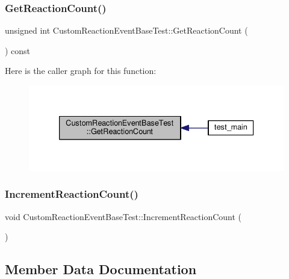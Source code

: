 \subsubsection{\texorpdfstring{Get\+Reaction\+Count()}{GetReactionCount()}}
{\footnotesize\ttfamily unsigned int Custom\+Reaction\+Event\+Base\+Test\+::\+Get\+Reaction\+Count (\begin{DoxyParamCaption}{ }\end{DoxyParamCaption}) const\hspace{0.3cm}{\ttfamily [inline]}}

Here is the caller graph for this function\+:
\nopagebreak
\begin{figure}[H]
\begin{center}
\leavevmode
\includegraphics[width=333pt]{struct_custom_reaction_event_base_test_ab25bee1f8c4635a60a23408e0f24ad86_icgraph}
\end{center}
\end{figure}
\mbox{\label{struct_custom_reaction_event_base_test_aa82af380cb529195b67b6419dccf944b}} 
\subsubsection{\texorpdfstring{Increment\+Reaction\+Count()}{IncrementReactionCount()}}
{\footnotesize\ttfamily void Custom\+Reaction\+Event\+Base\+Test\+::\+Increment\+Reaction\+Count (\begin{DoxyParamCaption}{ }\end{DoxyParamCaption})\hspace{0.3cm}{\ttfamily [inline]}}



\subsection{Member Data Documentation}
\mbox{\label{struct_custom_reaction_event_base_test_a9a21cf27c9aec21318d46e931e973315}} 
